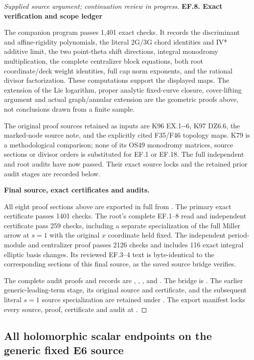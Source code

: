 \begin{proof}[Supplied source argument; continuation review in progress]
\medskip\noindent\textbf{EF.8. Exact verification and scope ledger}

\par\nobreak

The companion program
 passes 1,401 exact
checks. It records the discriminant and affine-rigidity
polynomials, the literal 2G/3G chord identities and IV* additive limit,
the two point-theta shift directions, integral monodromy multiplication,
the complete centralizer block equations, both root coordinate/deck
weight identities, full cap norm exponents, and the rational divisor
factorization. These computations support the displayed maps. The
extension of the Lie logarithm, proper analytic fixed-curve closure,
cover-lifting argument and actual graph/annular extension are the
geometric proofs above, not conclusions drawn from a finite sample.

The original proof sources retained as inputs are K96 EX.1-\/-6, K97
DZ6.6, the marked-node source note, and the explicitly cited F35/F46
topology maps. K79 is a methodological comparison; none of its OS49
monodromy matrices, source sections or divisor orders is substituted
for EF.1 or EF.18. The full independent and root audits have now passed. Their exact source locks and the retained prior audit stages are recorded below.

\par\medskip\noindent\textbf{Final source, exact certificates and audits.}\par
All eight proof sections above are exported in full from
.
The primary exact certificate passes 1401 checks. The root's complete
EF.1--8 read and independent certificate pass 259 checks, including
a separate specialization of the full Miller arrow at \(s=1\)
with the original \(x\) coordinate held fixed. The independent
period-module and centralizer proof passes 2126 checks and includes
116 exact integral elliptic basis changes. Its reviewed EF.3--4
text is byte-identical to the corresponding sections of this final
source, as the saved source bridge verifies.

The complete audit proofs and records are
,
,
, and
.
The bridge is
.
The earlier generic-leading-term stage, its original source and
certificate, and the subsequent literal \(s=1\) source specialization
are retained under
.
The export manifest locks every source, proof, certificate and audit
at .


\end{proof}


\subsection{All holomorphic scalar endpoints on the generic fixed E6 source}
